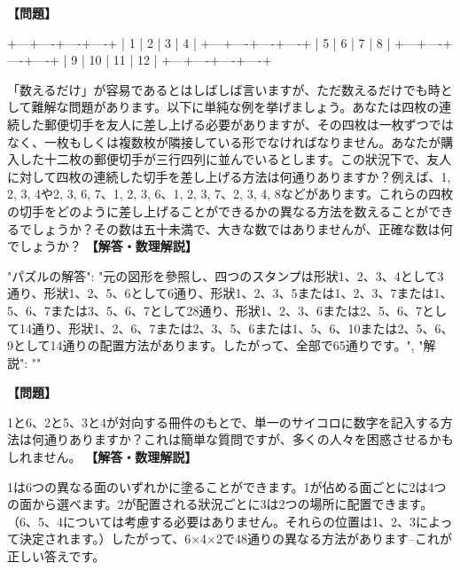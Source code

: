 \documentclass[10pt,a4paper,oneside,openany]{ltjsbook}
\begin{document}
\begin{tcolorbox}[colback=softblue,colframe=primaryblue,title=\textbf{第 285 問：THE FOUR POSTAGE STAMPS.},arc=2mm,boxrule=1pt,breakable]
\textbf{【問題】}\par\vspace{0.3em}
+---+----+----+----+
| 1 |  2 |  3 |  4 |
+---+----+----+----+
| 5 |  6 |  7 |  8 |
+---+----+----+----+
| 9 | 10 | 11 | 12 |
+---+----+----+----+

「数えるだけ」が容易であるとはしばしば言いますが、ただ数えるだけでも時として難解な問題があります。以下に単純な例を挙げましょう。あなたは四枚の連続した郵便切手を友人に差し上げる必要がありますが、その四枚は一枚ずつではなく、一枚もしくは複数枚が隣接している形でなければなりません。あなたが購入した十二枚の郵便切手が三行四列に並んでいるとします。この狀況下で、友人に対して四枚の連続した切手を差し上げる方法は何通りありますか？例えば、1, 2, 3, 4や2, 3, 6, 7、1, 2, 3, 6、1, 2, 3, 7、2, 3, 4, 8などがあります。これらの四枚の切手をどのように差し上げることができるかの異なる方法を数えることができるでしょうか？その数は五十未満で、大きな数ではありませんが、正確な数は何でしょうか？
\tcblower
\textbf{【解答・数理解説】}\par\vspace{0.3em}
{
"パズルの解答": "元の図形を參照し、四つのスタンプは形狀1、2、3、4として3通り、形狀1、2、5、6として6通り、形狀1、2、3、5または1、2、3、7または1、5、6、7または3、5、6、7として28通り、形狀1、2、3、6または2、5、6、7として14通り、形狀1、2、6、7または2、3、5、6または1、5、6、10または2、5、6、9として14通りの配置方法があります。したがって、全部で65通りです。",
"解説": ""
}
\end{tcolorbox}

\begin{tcolorbox}[colback=softblue,colframe=primaryblue,title=\textbf{第 286 問：サイコロを塗り分ける方法 （原題: PAINTING THE DIE.）},arc=2mm,boxrule=1pt,breakable]
\textbf{【問題】}\par\vspace{0.3em}
1と6、2と5、3と4が対向する冊件のもとで、単一のサイコロに数字を記入する方法は何通りありますか？これは簡単な質問ですが、多くの人々を困惑させるかもしれません。
\tcblower
\textbf{【解答・数理解説】}\par\vspace{0.3em}
1は6つの異なる面のいずれかに塗ることができます。1が佔める面ごとに2は4つの面から選べます。2が配置される狀況ごとに3は2つの場所に配置できます。（6、5、4については考慮する必要はありません。それらの位置は1、2、3によって決定されます。）したがって、6×4×2で48通りの異なる方法があります--これが正しい答えです。
\end{tcolorbox}
\end{document}
